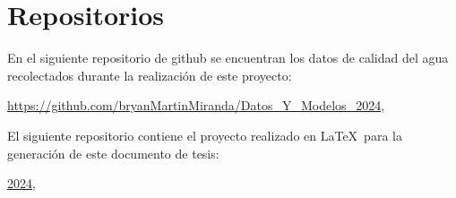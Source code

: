 \chapter{Repositorios}

En el siguiente repositorio de github se encuentran los datos de calidad del agua recolectados durante la realización de este proyecto:

\begin{center}
\url{https://github.com/bryanMartinMiranda/Datos_Y_Modelos_2024}, 
\end{center}

El siguiente repositorio contiene el proyecto realizado en \LaTeX\ para la generación de este documento de tesis:

\begin{center}
\url{2024}, 
\end{center}
